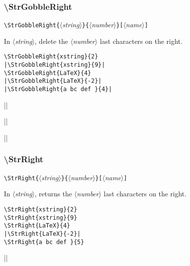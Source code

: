 \documentclass[a4paper,10pt]{article}
\newcommand\argu[1]{$\langle$\textit{#1}$\rangle$}
\newcommand\ARGU[1]{\texttt{\{}\argu{#1}\texttt{\}}}
\newcommand\arguC[1]{\texttt{[}\argu{#1}\texttt{]}}
\newcommand\styleexemple{\small\vskip4pt}
\newcommand\verbinline{\lstinline[basicstyle=\normalsize\ttfamily]}
\begin{document}
\subsubsection{\ttfamily\textbackslash StrGobbleRight}

\verbinline|\StrGobbleRight|\ARGU{string}\ARGU{number}\arguC{name}
\smallskip

In \argu{string}, delete the \argu{number} last characters on the right.\medskip

\begin{minipage}[t]{0.65\linewidth}
\begin{lstlisting}
\StrGobbleRight{xstring}{2}
|\StrGobbleRight{xstring}{9}|
\StrGobbleRight{LaTeX}{4}
|\StrGobbleRight{LaTeX}{-2}|
|\StrGobbleRight{a bc def }{4}|
\end{lstlisting}%
\end{minipage}\hfill
\begin{minipage}[t]{0.35\linewidth}
	\styleexemple
	\par
	||\par
	\par
	||\par
	||
\end{minipage}%

\subsubsection{\ttfamily\textbackslash StrRight}

\verbinline|\StrRight|\ARGU{string}\ARGU{number}\arguC{name}
\smallskip

In \argu{string}, returns the \argu{number} last characters on the right.\medskip

\begin{minipage}[t]{0.65\linewidth}
\begin{lstlisting}
\StrRight{xstring}{2}
\StrRight{xstring}{9}
\StrRight{LaTeX}{4}
|\StrRight{LaTeX}{-2}|
\StrRight{a bc def }{5}
\end{lstlisting}%
\end{minipage}\hfill
\begin{minipage}[t]{0.35\linewidth}
	\styleexemple
	\par
	\par
	\par
	||\par
\end{minipage}%
\end{document}
